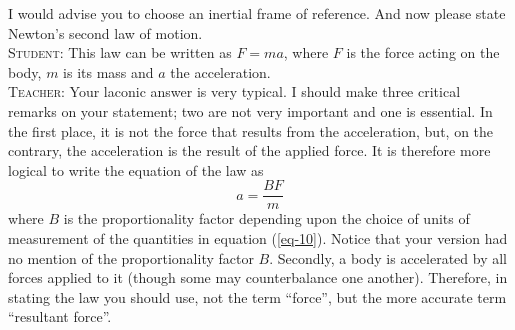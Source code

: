 \documentclass[a4paper,sfsidenotes]{tufte-book}
\begin{document}
I would advise you to choose an inertial frame of reference. And now please state Newton's second law of motion.\\
\textsc{Student:} This law can be written as $F=ma$, where $F$ is the
force acting on the body, $m$ is its mass and $a$ the acceleration.\\
\textsc{Teacher:} Your laconic answer is very typical. I should make three critical remarks on your statement; two are not very important and one is essential. In the first place, it is not the force that results from the acceleration, but, on the contrary, the acceleration is the result of the applied force. It is therefore more logical to write the equation of the law as
\begin{equation}
a=\frac{BF}{m}
\label{eq-10}
\end{equation}
where $B$ is the proportionality factor depending upon the choice of units of measurement of the quantities in equation (\ref{eq-10}). Notice that your version had no mention of the proportionality factor $B$. Secondly, a body is accelerated by all forces applied to it (though some may counterbalance one another). Therefore, in stating the law you should use, not the term ``force'', but the
more accurate term ``resultant force''.
\end{document}
